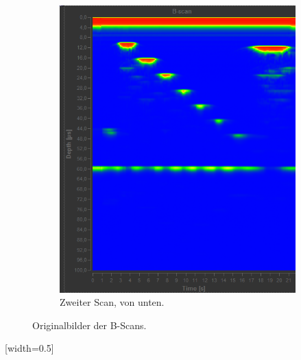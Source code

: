 \begin{figure}
\begin{subfigure}{0.48\textwidth}
    \includegraphics[width=\textwidth]{daten/b/2.png}
    \caption{Zweiter Scan, von unten.}
    \label{fig:db2}
  \end{subfigure}
  \caption{Originalbilder der B-Scans.}
  \label{fig:db}
\end{figure}
[width=0.5\textwidth]
